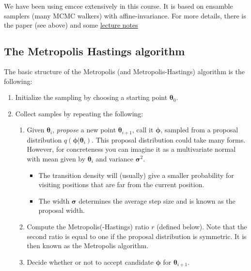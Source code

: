 \documentclass[%
oneside,                 %
final,                   %
10pt]{article}
\begin{document}
\noindent
We have been using emcee extensively in this course. It is based on ensamble samplers (many MCMC walkers) with affine-invariance. For more details, there is the paper (see above) and some \href{{http://iacs-courses.seas.harvard.edu/courses/am207/blog/lecture-16.html}}{lecture notes}


\subsection{The Metropolis Hastings algorithm}
The basic structure of the Metropolis (and Metropolis-Hastings) algorithm is the following:

\begin{enumerate}
\item Initialize the sampling by choosing a starting point $\boldsymbol{\theta}_0$.

\item Collect samples by repeating the following:
\begin{enumerate}

 \item Given $\boldsymbol{\theta}_i$, \emph{propose} a new point $\boldsymbol{\theta}_{i+1}$, call it $\boldsymbol{\phi}$, sampled from a proposal distribution $q( \boldsymbol{\phi} | \boldsymbol{\theta}_i )$. This proposal distribution could take many forms. However, for concreteness you can imagine it as a multivariate normal with mean given by $\boldsymbol{\theta}_i$ and variance $\boldsymbol{\sigma}^2$.
\begin{itemize}

    \item The transition density will (usually) give a smaller probability for visiting positions that are far from the current position.

    \item The width $\boldsymbol{\sigma}$ determines the average step size and is known as the proposal width.

\end{itemize}

\noindent
 \item Compute the Metropolis(-Hastings) ratio $r$ (defined below).
    Note that the second ratio is equal to one if the proposal distribution is symmetric. It is then known as the Metropolis algorithm.

 \item Decide whether or not to accept candidate $\boldsymbol{\phi}$ for $\boldsymbol{\theta}_{i+1}$. 
\begin{itemize}


\end{itemize}
\end{enumerate}
\end{enumerate}
\end{document}
